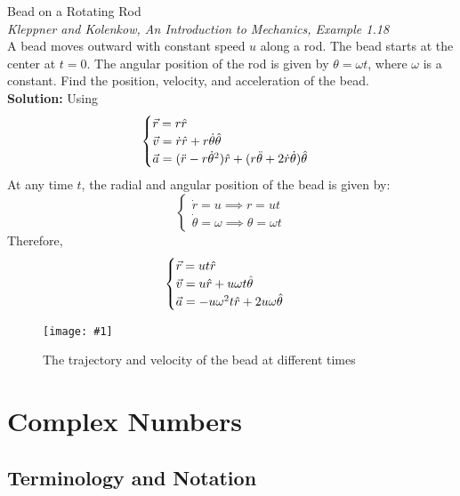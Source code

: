 \documentclass[11pt]{article}
\newcommand{\fig}[4]{
    \begin{figure}[H]
        \centering
        \texttt{[image: \#1]}
        \caption{#2}
        \label{exp4fit}
    \end{figure}
}
\theoremstyle{gangnamstyle}{\newtheorem{definition}{Definition}[]}
\theoremstyle{gangnamstyle}{\newtheorem{example}{Example}[]}
\theoremstyle{gangnamstyle}{\newtheorem{problem}{Problem}[]}
\begin{document}
\begin{example}
Bead on a Rotating Rod \\ 
\textit{Kleppner and Kolenkow, An Introduction to Mechanics, Example 1.18} \\
A bead moves outward with constant speed $u$ along a rod. The bead starts at the center at $t = 0$. The angular position of the rod is given by $\theta = \omega t$, where $\omega$ is a constant. Find the position, velocity, and acceleration of the bead. \\

\textbf{Solution:} Using
\[ \begin{cases}
\Vec{r} = r\Hat{r} \\
\Vec{v} = \Dot{r}\Hat{r} + r\Dot{\theta}\Hat{\theta} \\
\Vec{a} = (\Ddot{r} - r\Dot{\theta}^2)\Hat{r} + (r\Ddot{\theta} + 2\Dot{r}\Dot{\theta})\Hat{\theta}
\end{cases}\]
At any time $t$, the radial and angular position of the bead is given by: 
\[ \begin{cases}
\Dot{r} = u \implies r = ut \\
\Dot{\theta} = \omega \implies\theta = \omega t
\end{cases} \]
Therefore, 
\[ \begin{cases}
\Vec{r} = ut\Hat{r} \\
\Vec{v} = u\Hat{r} + u\omega t\Hat{\theta} \\
\Vec{a} = -u\omega^2t\Hat{r} + 2u\omega\Hat{\theta}
\end{cases} \]

\fig{figs/n0/ex1.jpg}{The trajectory and velocity of the bead at different times}{0.5}{0}
\end{example}

\pagebreak

\section{Complex Numbers}

\subsection{Terminology and Notation}
\end{document}

